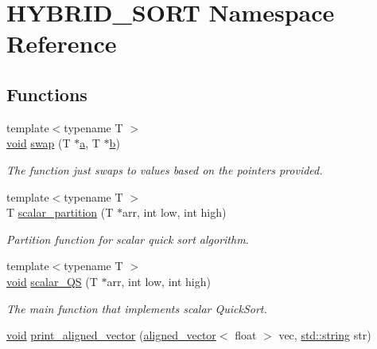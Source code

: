 \hypertarget{namespaceHYBRID__SORT}{}\section{H\+Y\+B\+R\+I\+D\+\_\+\+S\+O\+RT Namespace Reference}
\label{namespaceHYBRID__SORT}
\subsection*{Functions}
\begin{DoxyCompactItemize}
\item 
{\footnotesize template$<$typename T $>$ }\\\mbox{\hyperlink{glad_8h_a950fc91edb4504f62f1c577bf4727c29}{void}} \mbox{\hyperlink{namespaceHYBRID__SORT_ac7b73df60799b21d3451aa838627d881}{swap}} (T $\ast$\mbox{\hyperlink{glad_8h_ac8729153468b5dcf13f971b21d84d4e5}{a}}, T $\ast$\mbox{\hyperlink{glad_8h_a6eba317e3cf44d6d26c04a5a8f197dcb}{b}})
\begin{DoxyCompactList}\small\item\em The function just swaps to values based on the pointers provided. \end{DoxyCompactList}\item 
{\footnotesize template$<$typename T $>$ }\\T \mbox{\hyperlink{namespaceHYBRID__SORT_a368e263837d7996212a20d788d9e85ac}{scalar\+\_\+partition}} (T $\ast$arr, int low, int high)
\begin{DoxyCompactList}\small\item\em Partition function for scalar quick sort algorithm. \end{DoxyCompactList}\item 
{\footnotesize template$<$typename T $>$ }\\\mbox{\hyperlink{glad_8h_a950fc91edb4504f62f1c577bf4727c29}{void}} \mbox{\hyperlink{namespaceHYBRID__SORT_a70cac879f3750d9b5213463f07a4a1b1}{scalar\+\_\+\+QS}} (T $\ast$arr, int low, int high)
\begin{DoxyCompactList}\small\item\em The main function that implements scalar Quick\+Sort. \end{DoxyCompactList}\item 
\mbox{\hyperlink{glad_8h_a950fc91edb4504f62f1c577bf4727c29}{void}} \mbox{\hyperlink{namespaceHYBRID__SORT_aa822314eab01e2f91b0131e98fbd638b}{print\+\_\+aligned\+\_\+vector}} (\mbox{\hyperlink{type__definitions_8hpp_a087efd587d66b881646ef378f1919c90}{aligned\+\_\+vector}}$<$ float $>$ vec, \mbox{\hyperlink{glad_8h_ac83513893df92266f79a515488701770}{std\+::string}} str)

\end{DoxyCompactItemize}
